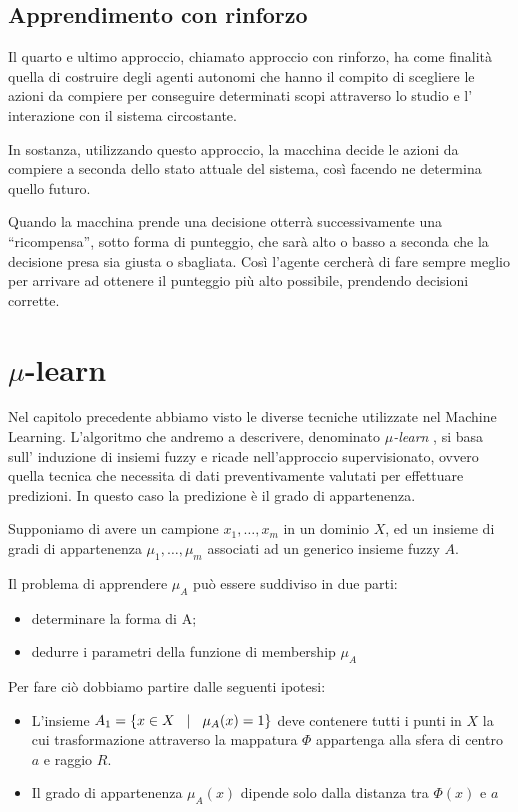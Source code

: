 \documentclass[a4paper,12pt]{report}
\begin{document}
\subsection*{Apprendimento con rinforzo}
Il quarto e ultimo approccio, chiamato approccio con rinforzo, ha come finalità quella di costruire degli agenti autonomi che hanno il compito di scegliere le azioni da compiere per conseguire determinati scopi attraverso lo studio e l' interazione con il sistema circostante.

In sostanza, utilizzando questo approccio, la macchina decide le azioni da compiere a seconda dello stato attuale del sistema, così facendo ne determina quello futuro.

Quando la macchina prende una decisione otterrà successivamente una “ricompensa”, sotto forma di punteggio, che sarà alto o basso a seconda che la decisione presa sia giusta o sbagliata. Così l'agente cercherà di fare sempre meglio per arrivare ad ottenere il punteggio più alto possibile, prendendo decisioni corrette.




\section{\texorpdfstring{$\mu$}{mu}-learn}
Nel capitolo precedente abbiamo visto le diverse tecniche utilizzate nel Machine Learning. L’algoritmo che andremo a descrivere, denominato \textit{$\mu$-learn} \cite{mulearn}, si basa sull’ induzione di insiemi fuzzy e ricade nell’approccio supervisionato, ovvero quella tecnica che necessita di dati preventivamente valutati per effettuare predizioni. In questo caso la predizione è il grado di appartenenza.

\bigskip

Supponiamo di avere un campione {$x_1,\dots,x_m$} in un dominio $X$, ed un insieme di gradi di appartenenza {$\mu_1,\dots,\mu_m$} associati ad un generico insieme fuzzy $A$. 

Il problema di apprendere $\mu_A$ può essere suddiviso in due parti:
\begin{itemize}
    \item determinare la forma di A;
    \item dedurre i parametri della funzione di membership $\mu_A$
\end{itemize}

Per fare ciò dobbiamo partire dalle seguenti ipotesi:
\begin{itemize}
    \item L'insieme $A_1 = \{ x\in X \hspace{0,3cm} |\hspace{0,3cm} \mu_A(x) = 1 \}$ deve contenere tutti i punti in $X$ la cui trasformazione attraverso la mappatura $\Phi$ appartenga alla sfera di centro $a$ e raggio $R$.
    
    \item Il grado di appartenenza $\mu_A(x)$ dipende solo dalla distanza tra $\Phi(x)$ e $a$
\end{itemize}
\end{document}
